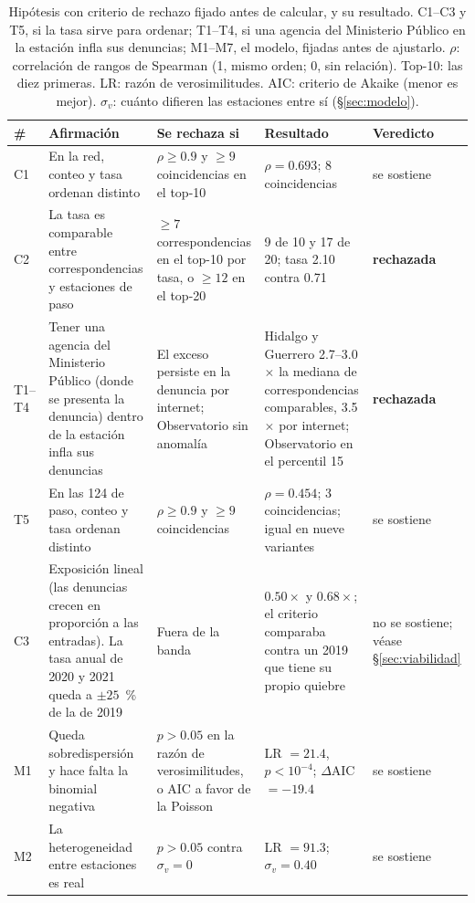 \documentclass[conference]{IEEEtran}
\begin{document}
\begin{table}[t]
\centering
\caption{Hipótesis con criterio de rechazo fijado antes de calcular, y su resultado. C1--C3 y T5, si la tasa sirve para ordenar; T1--T4, si una agencia del Ministerio Público en la estación infla sus denuncias; M1--M7, el modelo, fijadas antes de ajustarlo. $\rho$: correlación de rangos de Spearman (1, mismo orden; 0, sin relación). Top-10: las diez primeras. LR: razón de verosimilitudes. AIC: criterio de Akaike (menor es mejor). $\sigma_v$: cuánto difieren las estaciones entre sí (§\ref{sec:modelo}).}
\label{tab:hipotesis}
\small
\begin{tabular}{@{}l L{4.8cm} L{4.0cm} L{4.3cm} L{1.7cm}@{}}
\toprule
\# & Afirmación & Se rechaza si & Resultado & Veredicto \\
\midrule
C1 & En la red, conteo y tasa ordenan distinto & $\rho \geq 0.9$ y $\geq 9$ coincidencias en el top-10 & $\rho = 0.693$; 8 coincidencias & se sostiene \\
C2 & La tasa es comparable entre correspondencias y estaciones de paso & $\geq 7$ correspondencias en el top-10 por tasa, o $\geq 12$ en el top-20 & 9 de 10 y 17 de 20; tasa 2.10 contra 0.71 & \textbf{rechazada} \\
T1--T4 & Tener una agencia del Ministerio Público (donde se presenta la denuncia) dentro de la estación infla sus denuncias & El exceso persiste en la denuncia por internet; Observatorio sin anomalía & Hidalgo y Guerrero 2.7--3.0$\times$ la mediana de correspondencias comparables, 3.5$\times$ por internet; Observatorio en el percentil 15 & \textbf{rechazada} \\
T5 & En las 124 de paso, conteo y tasa ordenan distinto & $\rho \geq 0.9$ y $\geq 9$ coincidencias & $\rho = 0.454$; 3 coincidencias; igual en nueve variantes & se sostiene \\
C3 & Exposición lineal (las denuncias crecen en proporción a las entradas). La tasa anual de 2020 y 2021 queda a $\pm 25$~\% de la de 2019 & Fuera de la banda & $0.50\times$ y $0.68\times$; el criterio comparaba contra un 2019 que tiene su propio quiebre & no se sostiene; véase §\ref{sec:viabilidad} \\
M1 & Queda sobredispersión y hace falta la binomial negativa & $p > 0.05$ en la razón de verosimilitudes, o AIC a favor de la Poisson & LR $= 21.4$, $p < 10^{-4}$; $\Delta$AIC $= -19.4$ & se sostiene \\
M2 & La heterogeneidad entre estaciones es real & $p > 0.05$ contra $\sigma_v = 0$ & LR $= 91.3$; $\sigma_v = 0.40$ & se sostiene \\

\end{tabular}
\end{table}
\end{document}

